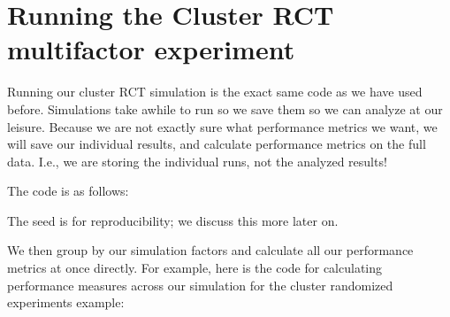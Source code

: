 \documentclass[
]{book}
\newenvironment{Shaded}{\begin{snugshade}}{\end{snugshade}}
\newcommand{\AttributeTok}[1]{\textcolor[rgb]{0.13,0.29,0.53}{#1}}
\newcommand{\DecValTok}[1]{\textcolor[rgb]{0.00,0.00,0.81}{#1}}
\newcommand{\FunctionTok}[1]{\textcolor[rgb]{0.13,0.29,0.53}{\textbf{#1}}}
\newcommand{\NormalTok}[1]{#1}
\newcommand{\OtherTok}[1]{\textcolor[rgb]{0.56,0.35,0.01}{#1}}
\newcommand{\SpecialCharTok}[1]{\textcolor[rgb]{0.81,0.36,0.00}{\textbf{#1}}}
\newcommand{\StringTok}[1]{\textcolor[rgb]{0.31,0.60,0.02}{#1}}
\begin{document}
\section{Running the Cluster RCT multifactor experiment}\label{running-the-cluster-rct-multifactor-experiment}

Running our cluster RCT simulation is the exact same code as we have used before.
Simulations take awhile to run so we save them so we can analyze at our leisure.
Because we are not exactly sure what performance metrics we want, we will save our individual results, and calculate performance metrics on the full data.
I.e., we are storing the individual runs, not the analyzed results!

The code is as follows:

\begin{Shaded}
\end{Shaded}

The seed is for reproducibility; we discuss this more later on.

We then group by our simulation factors and calculate all our performance metrics at once directly.
For example, here is the code for calculating performance measures across our simulation for the cluster randomized experiments example:
\end{document}
